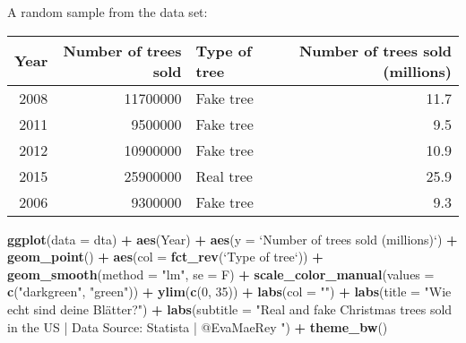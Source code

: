 \documentclass[]{book}
\newenvironment{Shaded}{\begin{snugshade}}{\end{snugshade}}
\newcommand{\KeywordTok}[1]{\textcolor[rgb]{0.13,0.29,0.53}{\textbf{#1}}}
\newcommand{\DataTypeTok}[1]{\textcolor[rgb]{0.13,0.29,0.53}{#1}}
\newcommand{\DecValTok}[1]{\textcolor[rgb]{0.00,0.00,0.81}{#1}}
\newcommand{\StringTok}[1]{\textcolor[rgb]{0.31,0.60,0.02}{#1}}
\newcommand{\OperatorTok}[1]{\textcolor[rgb]{0.81,0.36,0.00}{\textbf{#1}}}
\newcommand{\NormalTok}[1]{#1}
\theoremstyle{definition}
\theoremstyle{definition}
\theoremstyle{definition}
\theoremstyle{remark}
\begin{document}
A random sample from the data set:

\begin{tabular}{r|r|l|r}
\hline
Year & Number of trees sold & Type of tree & Number of trees sold (millions)\\
\hline
2008 & 11700000 & Fake tree & 11.7\\
\hline
2011 & 9500000 & Fake tree & 9.5\\
\hline
2012 & 10900000 & Fake tree & 10.9\\
\hline
2015 & 25900000 & Real tree & 25.9\\
\hline
2006 & 9300000 & Fake tree & 9.3\\
\hline
\end{tabular}

\begin{Shaded}
\begin{Highlighting}[]
\KeywordTok{ggplot}\NormalTok{(}\DataTypeTok{data =}\NormalTok{ dta) }\OperatorTok{+}
\StringTok{  }\KeywordTok{aes}\NormalTok{(Year) }\OperatorTok{+}
\StringTok{  }\KeywordTok{aes}\NormalTok{(}\DataTypeTok{y =} \StringTok{`}\DataTypeTok{Number of trees sold (millions)}\StringTok{`}\NormalTok{) }\OperatorTok{+}
\StringTok{  }\KeywordTok{geom_point}\NormalTok{() }\OperatorTok{+}
\StringTok{  }\KeywordTok{aes}\NormalTok{(}\DataTypeTok{col =} \KeywordTok{fct_rev}\NormalTok{(}\StringTok{`}\DataTypeTok{Type of tree}\StringTok{`}\NormalTok{)) }\OperatorTok{+}
\StringTok{  }\KeywordTok{geom_smooth}\NormalTok{(}\DataTypeTok{method =} \StringTok{"lm"}\NormalTok{, }\DataTypeTok{se =}\NormalTok{ F) }\OperatorTok{+}
\StringTok{  }\KeywordTok{scale_color_manual}\NormalTok{(}\DataTypeTok{values =} \KeywordTok{c}\NormalTok{(}\StringTok{"darkgreen"}\NormalTok{, }\StringTok{"green"}\NormalTok{)) }\OperatorTok{+}
\StringTok{  }\KeywordTok{ylim}\NormalTok{(}\KeywordTok{c}\NormalTok{(}\DecValTok{0}\NormalTok{, }\DecValTok{35}\NormalTok{)) }\OperatorTok{+}
\StringTok{  }\KeywordTok{labs}\NormalTok{(}\DataTypeTok{col =} \StringTok{""}\NormalTok{) }\OperatorTok{+}
\StringTok{  }\KeywordTok{labs}\NormalTok{(}\DataTypeTok{title =} \StringTok{"Wie echt sind deine Blätter?"}\NormalTok{) }\OperatorTok{+}
\StringTok{  }\KeywordTok{labs}\NormalTok{(}\DataTypeTok{subtitle =} \StringTok{"Real and fake Christmas trees sold in the US | Data Source: Statista | @EvaMaeRey "}\NormalTok{) }\OperatorTok{+}
\StringTok{  }\KeywordTok{theme_bw}\NormalTok{() }
\end{Highlighting}
\end{Shaded}
\end{document}

